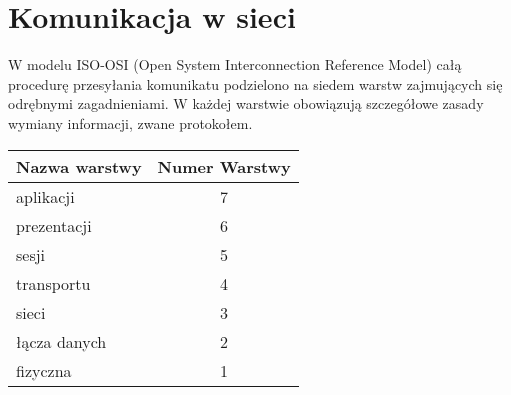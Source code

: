 \documentclass[a4paper, 10pt]{article}
\begin{document}
\section*{Komunikacja w sieci}
 W modelu ISO-OSI (Open System Interconnection Reference Model) całą procedurę przesyłania komunikatu podzielono na siedem warstw zajmujących się odrębnymi zagadnieniami. W każdej warstwie obowiązują szczegółowe zasady wymiany informacji, zwane protokołem.

\begin{table}[h]
\begin{center}
\begin{tabular}{|l|c|}\hline
 Nazwa warstwy &  Numer Warstwy \\\hline \hline
 aplikacji & 7 \\ \hline
 prezentacji & 6 \\ \hline
 sesji & 5 \\
\hline \hline
 transportu &  4 \\ \hline
 sieci &  3\\ \hline
 łącza danych &  2\\ \hline
 fizyczna &  1\\ \hline
\end{tabular}
\end{center}
\end{table}
\end{document}
